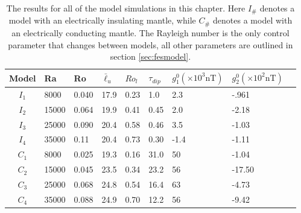\begin{table}
\centering
\begin{tabular}{cllllllll}
\multicolumn{1}{l}{Model} & Ra    & Ro    & $\bar{\ell}_{u}$ & $Ro_{l}$ & $\tau_{dip}$ & $g_1^0 (\times 10^{3} \textrm{nT})$ & $g_2^0 (\times 10^{2} \textrm{nT})$ \\ \hline  %
$I_{1}$                 & 8000  & 0.040 & 17.9             & 0.23     & 1.0          & 2.3                                 & -.961      &  \\                               %
$I_{2}$                 & 15000 & 0.064 & 19.9             & 0.41     & 0.45         & 2.0                                 & -2.18      &  \\                                %
$I_{3}$                 & 25000 & 0.090 & 20.4             & 0.58     & 0.46         & 3.5                                 & -1.03      &  \\                                %
$I_{4}$                 & 35000 & 0.11  & 20.4             & 0.73     & 0.30         & -1.4                                & -1.11      &  \\                               %
$C_{1}$                 & 8000  & 0.025 & 19.3             & 0.16     & 31.0         & 50                                  & -1.04      &  \\                               %
$C_{2}$                 & 15000 & 0.045 & 23.5             & 0.34     & 23.2         & 56                                  & -17.50      &  \\                                 %
$C_{3}$                 & 25000 & 0.068 & 24.8             & 0.54     & 16.4         & 63                                  & -4.73      &  \\                                 %
$C_{4}$                 & 35000 & 0.088 & 24.9             & 0.70     & 12.2         & 56                                  & -9.42      &                                   %
\end{tabular}
\caption{The results for all of the model simulations in this chapter. Here $I_{\#}$ denotes a model with an electrically insulating mantle, while $C_{\#}$ denotes a model with an electrically conducting mantle. The Rayleigh number is the only control parameter that changes between models, all other parameters are outlined in section \ref{sec:fesmodel}.}
\label{tab:fesresults}
\end{table}

